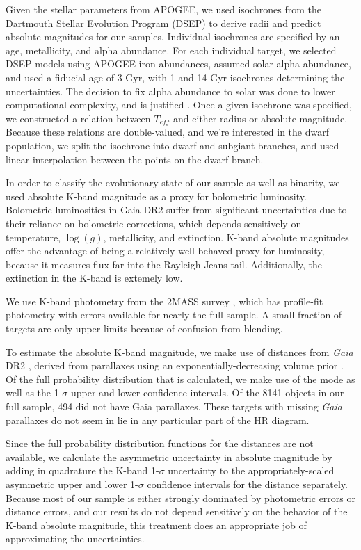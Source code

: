 \documentclass[manuscript]{aastex6}
\newcommand{\Gaia}{\mbox{\textit{Gaia}}}
\newcommand{\Teff}{\ensuremath{T_{eff}}}
\newcommand{\logg}{\ensuremath{\log(g)}}
\newcommand{\gvs}{\authorcomment1}
\begin{document}
Given the stellar parameters from APOGEE, we used isochrones from the Dartmouth
Stellar Evolution Program (DSEP) \citep{Dotter07,Dotter08} to derive
radii and predict absolute magnitudes for our samples. Individual
isochrones are specified by an age,
metallicity, and alpha abundance. For each individual target, we
selected DSEP models using APOGEE iron abundances, assumed solar alpha 
abundance, and used a fiducial age of 3 Gyr, with 1 and 14 Gyr
isochrones determining the uncertainties. The decision to fix alpha
abundance to solar was done to lower computational complexity, and is
justified \gvs{Plot a histogram to check this}. Once a given isochrone
was specified, we constructed a relation between \Teff{} and either radius
or absolute magnitude. Because these relations are double-valued, and
we're interested in the dwarf population, we split the isochrone into 
dwarf and subgiant branches, and used linear interpolation between the
points on the dwarf branch.

In order to classify the evolutionary state of our sample as well as
binarity, we used absolute K-band magnitude as a proxy for bolometric
luminosity. Bolometric luminosities in Gaia DR2 suffer from significant
uncertainties due to their reliance on bolometric corrections, which
depends sensitively on temperature, \logg{}, metallicity, and extinction. 
K-band absolute magnitudes offer the advantage of being a relatively 
well-behaved proxy for luminosity, because it measures flux far into the 
Rayleigh-Jeans tail. Additionally, the extinction in the K-band
is extemely low.

We use K-band photometry from the 2MASS survey \citep{Skrutskie06}, which has
profile-fit photometry with errors available for nearly the full sample. A 
small fraction of targets are only upper limits because of confusion from 
blending. \gvs{Calculate fraction}

To estimate the absolute K-band magnitude, we make use of distances from
\Gaia{} DR2 \citep{Gaia16,Gaia18}, derived from parallaxes using an
exponentially-decreasing volume prior \citep{Berger18b}. Of the full probability
distribution that is calculated, we make use of the mode as well as the
1-\(\sigma\) upper and lower confidence intervals. Of the 8141 objects in our
full sample, 494 did not have Gaia parallaxes. These targets with missing
\Gaia{} parallaxes do not seem in lie in any particular part of the HR diagram.

Since the full probability distribution functions for the distances are
not available, we calculate the asymmetric uncertainty in absolute
magnitude by adding in quadrature the K-band 1-\(\sigma\) uncertainty to
the appropriately-scaled asymmetric upper and lower 1-\(\sigma\) confidence 
intervals for the distance separately. Because most of our sample is
either strongly dominated by photometric errors or distance errors, and
our results do not depend sensitively on the behavior of the K-band
absolute magnitude, this treatment does an appropriate job of
approximating the uncertainties.
\end{document}
